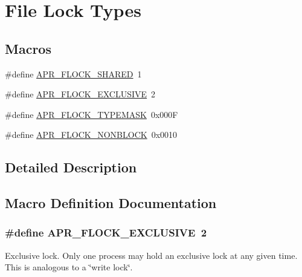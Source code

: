 \hypertarget{group__apr__file__lock__types}{}\section{File Lock Types}
\label{group__apr__file__lock__types}
\subsection*{Macros}
\begin{DoxyCompactItemize}
\item 
\#define \hyperlink{group__apr__file__lock__types_gaba177fe81cd70b389753ad2096b2ce7c}{A\+P\+R\+\_\+\+F\+L\+O\+C\+K\+\_\+\+S\+H\+A\+R\+ED}~1
\item 
\#define \hyperlink{group__apr__file__lock__types_gafbf0caa093b99bdf11e25360b9099852}{A\+P\+R\+\_\+\+F\+L\+O\+C\+K\+\_\+\+E\+X\+C\+L\+U\+S\+I\+VE}~2
\item 
\#define \hyperlink{group__apr__file__lock__types_ga40777e364fb20bb9a9ee57e74b19c13d}{A\+P\+R\+\_\+\+F\+L\+O\+C\+K\+\_\+\+T\+Y\+P\+E\+M\+A\+SK}~0x000F
\item 
\#define \hyperlink{group__apr__file__lock__types_gab327fa0250e19006f20d5ec65fe7f22a}{A\+P\+R\+\_\+\+F\+L\+O\+C\+K\+\_\+\+N\+O\+N\+B\+L\+O\+CK}~0x0010
\end{DoxyCompactItemize}


\subsection{Detailed Description}


\subsection{Macro Definition Documentation}
\subsubsection[{\texorpdfstring{A\+P\+R\+\_\+\+F\+L\+O\+C\+K\+\_\+\+E\+X\+C\+L\+U\+S\+I\+VE}{APR_FLOCK_EXCLUSIVE}}]{\setlength{\rightskip}{0pt plus 5cm}\#define A\+P\+R\+\_\+\+F\+L\+O\+C\+K\+\_\+\+E\+X\+C\+L\+U\+S\+I\+VE~2}\hypertarget{group__apr__file__lock__types_gafbf0caa093b99bdf11e25360b9099852}{}\label{group__apr__file__lock__types_gafbf0caa093b99bdf11e25360b9099852}
Exclusive lock. Only one process may hold an exclusive lock at any given time. This is analogous to a \char`\"{}write lock\char`\"{}. 
